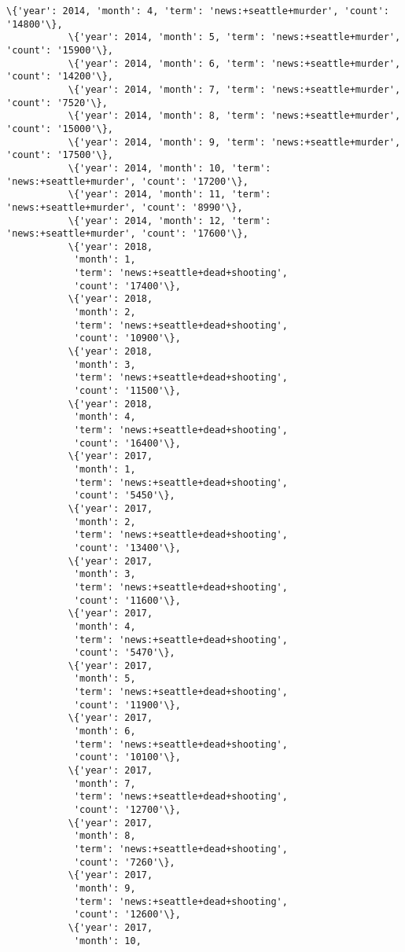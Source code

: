 \documentclass[11pt]{article}
\begin{document}
\begin{Verbatim}[commandchars=\\\{\}]
           \{'year': 2014, 'month': 4, 'term': 'news:+seattle+murder', 'count': '14800'\},
           \{'year': 2014, 'month': 5, 'term': 'news:+seattle+murder', 'count': '15900'\},
           \{'year': 2014, 'month': 6, 'term': 'news:+seattle+murder', 'count': '14200'\},
           \{'year': 2014, 'month': 7, 'term': 'news:+seattle+murder', 'count': '7520'\},
           \{'year': 2014, 'month': 8, 'term': 'news:+seattle+murder', 'count': '15000'\},
           \{'year': 2014, 'month': 9, 'term': 'news:+seattle+murder', 'count': '17500'\},
           \{'year': 2014, 'month': 10, 'term': 'news:+seattle+murder', 'count': '17200'\},
           \{'year': 2014, 'month': 11, 'term': 'news:+seattle+murder', 'count': '8990'\},
           \{'year': 2014, 'month': 12, 'term': 'news:+seattle+murder', 'count': '17600'\},
           \{'year': 2018,
            'month': 1,
            'term': 'news:+seattle+dead+shooting',
            'count': '17400'\},
           \{'year': 2018,
            'month': 2,
            'term': 'news:+seattle+dead+shooting',
            'count': '10900'\},
           \{'year': 2018,
            'month': 3,
            'term': 'news:+seattle+dead+shooting',
            'count': '11500'\},
           \{'year': 2018,
            'month': 4,
            'term': 'news:+seattle+dead+shooting',
            'count': '16400'\},
           \{'year': 2017,
            'month': 1,
            'term': 'news:+seattle+dead+shooting',
            'count': '5450'\},
           \{'year': 2017,
            'month': 2,
            'term': 'news:+seattle+dead+shooting',
            'count': '13400'\},
           \{'year': 2017,
            'month': 3,
            'term': 'news:+seattle+dead+shooting',
            'count': '11600'\},
           \{'year': 2017,
            'month': 4,
            'term': 'news:+seattle+dead+shooting',
            'count': '5470'\},
           \{'year': 2017,
            'month': 5,
            'term': 'news:+seattle+dead+shooting',
            'count': '11900'\},
           \{'year': 2017,
            'month': 6,
            'term': 'news:+seattle+dead+shooting',
            'count': '10100'\},
           \{'year': 2017,
            'month': 7,
            'term': 'news:+seattle+dead+shooting',
            'count': '12700'\},
           \{'year': 2017,
            'month': 8,
            'term': 'news:+seattle+dead+shooting',
            'count': '7260'\},
           \{'year': 2017,
            'month': 9,
            'term': 'news:+seattle+dead+shooting',
            'count': '12600'\},
           \{'year': 2017,
            'month': 10,

\end{Verbatim}
\end{document}
